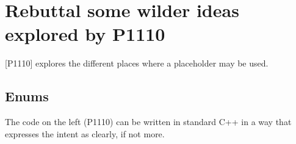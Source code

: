 \documentclass{wg21}
\begin{document}
{%
%
%

\section{Rebuttal some wilder ideas explored by P1110}

[P1110] explores the different places where a placeholder may be used.


\subsection{Enums}

The code on the left (P1110) can be written in standard C++ in a way that expresses the intent as clearly, if not more.

}
\end{document}
